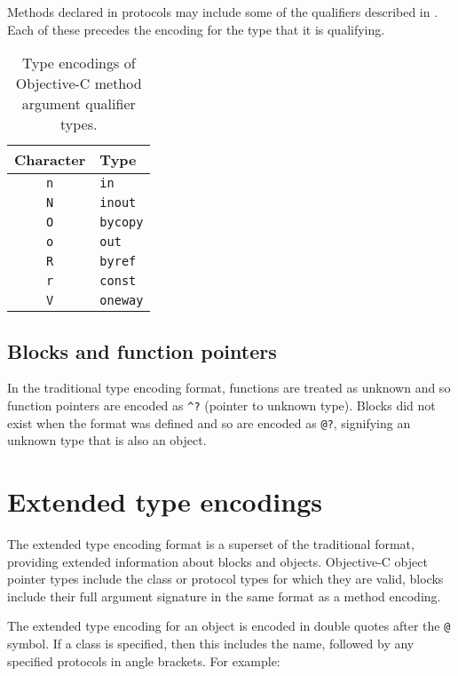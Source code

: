 \documentclass[a4paper]{report}
\newcommand{\objc}[1]{\lstinline[language={[Objective]C}]{#1}}
\begin{document}
Methods declared in protocols may include some of the qualifiers described in .
Each of these precedes the encoding for the type that it is qualifying.

\begin{table}
	\begin{center}
		\begin{tabular}{c|l}
			Character   & Type\\\hline
			\texttt{n} & \objc{in} \\
			\texttt{N} & \objc{inout} \\
			\texttt{O} & \objc{bycopy} \\
			\texttt{o} & \objc{out} \\
			\texttt{R} & \objc{byref} \\
			\texttt{r} & \objc{const} \\
			\texttt{V} & \objc{oneway}
		\end{tabular}
		\caption{\label{tab:objcqualencode}Type encodings of Objective-C method argument qualifier types.}
	\end{center}
\end{table}

\subsection{Blocks and function pointers}

In the traditional type encoding format, functions are treated as unknown and so function pointers are encoded as \texttt{\^{}?} (pointer to unknown type).
Blocks did not exist when the format was defined and so are encoded as \texttt{@?}, signifying an unknown type that is also an object.

\section{Extended type encodings}

The extended type encoding format is a superset of the traditional format, providing extended information about blocks and objects.
Objective-C object pointer types include the class or protocol types for which they are valid, blocks include their full argument signature in the same format as a method encoding.

The extended type encoding for an object is encoded in double quotes after the \texttt{@} symbol.
If a class is specified, then this includes the name, followed by any specified protocols in angle brackets.
For example:
\end{document}

